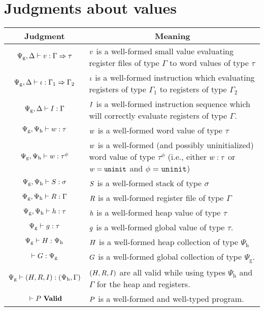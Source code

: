 \section{Judgments about values}
\begin{tabular}{|c|p{7.5 cm}|}
  \hline
  Judgment & \multicolumn{1}{|c|}{Meaning} \\
  \hline

  $\Psi_{\mathrm{g}}, \Delta |- v : \Gamma => \tau$ & $v$ is a well-formed small value evaluating register files of type $\Gamma$ to word values of type $\tau$ \\
  $\Psi_{\mathrm{g}}, \Delta |- \iota : \Gamma_1 => \Gamma_2$ & $\iota$ is a well-formed instruction which evaluating registers of type $\Gamma_1$ to registers of type $\Gamma_2$ \\
  $\Psi_{\mathrm{g}}, \Delta |- I : \Gamma$ & $I$ is a well-formed instruction sequence which will correctly evaluate registers of type $\Gamma$. \\
  \hline

  $\Psi_{\mathrm{g}}, \Psi_{\mathrm{h}} |- w : \tau$ & $w$ is a well-formed word value of type $\tau$ \\
  $\Psi_{\mathrm{g}}, \Psi_{\mathrm{h}} |- w : \tau^{\phi}$ & $w$ is a well-formed (and possibly uninitialized) word value of type $\tau^\phi$ (i.e., either $w : \tau$ or $w = \mathtt{uninit}$ and $\phi = \mathtt{uninit}$) \\
  $\Psi_{\mathrm{g}}, \Psi_{\mathrm{h}} |- S : \sigma$ & $S$ is a well-formed stack of type $\sigma$ \\
  $\Psi_{\mathrm{g}}, \Psi_{\mathrm{h}} |- R : \Gamma$ & $R$ is a well-formed register file of type $\Gamma$ \\
  $\Psi_{\mathrm{g}}, \Psi_{\mathrm{h}} |- h : \tau$ & $h$ is a well-formed heap value of type $\tau$ \\
  $\Psi_{\mathrm{g}} |- g : \tau$ & $g$ is a well-formed global value of type $\tau$. \\
  $\Psi_{\mathrm{g}} |- H : \Psi_{\mathrm{h}}$ & $H$ is a well-formed heap collection of type $\Psi_{\mathrm{h}}$ \\
  $|- G : \Psi_{\mathrm{g}}$ & $G$ is a well-formed global collection of type $\Psi_{\mathrm{g}}$. \\
  \hline

  $\Psi_{\mathrm{g}} |- (H, R, I) : (\Psi_{\mathrm{h}}, \Gamma)$ & $(H, R, I)$ are all valid while using types $\Psi_{\mathrm{h}}$ and $\Gamma$ for the heap and registers. \\
  ${} |- {P}\ \mathbf{Valid}$ & $P$ is a well-formed and well-typed program. \\
  \hline
\end{tabular}

